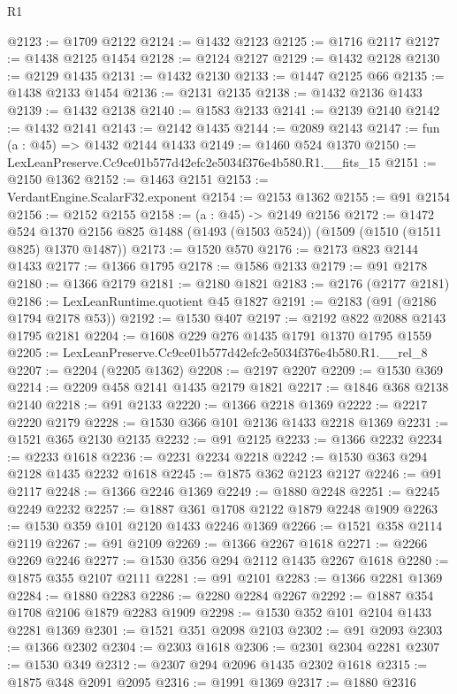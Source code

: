 \begin{lexlean}{R1}
\begin{coremodule}
@2123 := @1709 @2122
@2124 := @1432 @2123
@2125 := @1716 @2117
@2127 := @1438 @2125 @1454
@2128 := @2124 @2127
@2129 := @1432 @2128
@2130 := @2129 @1435
@2131 := @1432 @2130
@2133 := @1447 @2125 @66
@2135 := @1438 @2133 @1454
@2136 := @2131 @2135
@2138 := @1432 @2136 @1433
@2139 := @1432 @2138
@2140 := @1583 @2133
@2141 := @2139 @2140
@2142 := @1432 @2141
@2143 := @2142 @1435
@2144 := @2089 @2143
@2147 := fun (a : @45) => @1432 @2144 @1433
@2149 := @1460 @524 @1370
@2150 := LexLeanPreserve.Cc9ce01b577d42efc2e5034f376e4b580.R1.__fits_15
@2151 := @2150 @1362
@2152 := @1463 @2151
@2153 := VerdantEngine.ScalarF32.exponent
@2154 := @2153 @1362
@2155 := @91 @2154
@2156 := @2152 @2155
@2158 := (a : @45) -> @2149 @2156
@2172 := @1472
    @524
    @1370
    @2156
    @825
    @1488
    (@1493 (@1503 @524))
    (@1509 (@1510 (@1511 @825) @1370 @1487))
@2173 := @1520 @570
@2176 := @2173 @823 @2144 @1433
@2177 := @1366 @1795
@2178 := @1586 @2133
@2179 := @91 @2178
@2180 := @1366 @2179
@2181 := @2180 @1821
@2183 := @2176 (@2177 @2181)
@2186 := LexLeanRuntime.quotient @45 @1827
@2191 := @2183 (@91 (@2186 @1794 @2178 @53))
@2192 := @1530 @407
@2197 := @2192 @822 @2088 @2143 @1795 @2181
@2204 := @1608 @229 @276 @1435 @1791 @1370 @1795 @1559
@2205 := LexLeanPreserve.Cc9ce01b577d42efc2e5034f376e4b580.R1.__rel_8
@2207 := @2204 (@2205 @1362)
@2208 := @2197 @2207
@2209 := @1530 @369
@2214 := @2209 @458 @2141 @1435 @2179 @1821
@2217 := @1846 @368 @2138 @2140
@2218 := @91 @2133
@2220 := @1366 @2218 @1369
@2222 := @2217 @2220 @2179
@2228 := @1530 @366 @101 @2136 @1433 @2218 @1369
@2231 := @1521 @365 @2130 @2135
@2232 := @91 @2125
@2233 := @1366 @2232
@2234 := @2233 @1618
@2236 := @2231 @2234 @2218
@2242 := @1530 @363 @294 @2128 @1435 @2232 @1618
@2245 := @1875 @362 @2123 @2127
@2246 := @91 @2117
@2248 := @1366 @2246 @1369
@2249 := @1880 @2248
@2251 := @2245 @2249 @2232
@2257 := @1887 @361 @1708 @2122 @1879 @2248 @1909
@2263 := @1530 @359 @101 @2120 @1433 @2246 @1369
@2266 := @1521 @358 @2114 @2119
@2267 := @91 @2109
@2269 := @1366 @2267 @1618
@2271 := @2266 @2269 @2246
@2277 := @1530 @356 @294 @2112 @1435 @2267 @1618
@2280 := @1875 @355 @2107 @2111
@2281 := @91 @2101
@2283 := @1366 @2281 @1369
@2284 := @1880 @2283
@2286 := @2280 @2284 @2267
@2292 := @1887 @354 @1708 @2106 @1879 @2283 @1909
@2298 := @1530 @352 @101 @2104 @1433 @2281 @1369
@2301 := @1521 @351 @2098 @2103
@2302 := @91 @2093
@2303 := @1366 @2302
@2304 := @2303 @1618
@2306 := @2301 @2304 @2281
@2307 := @1530 @349
@2312 := @2307 @294 @2096 @1435 @2302 @1618
@2315 := @1875 @348 @2091 @2095
@2316 := @1991 @1369
@2317 := @1880 @2316

\end{coremodule}
\end{lexlean}
